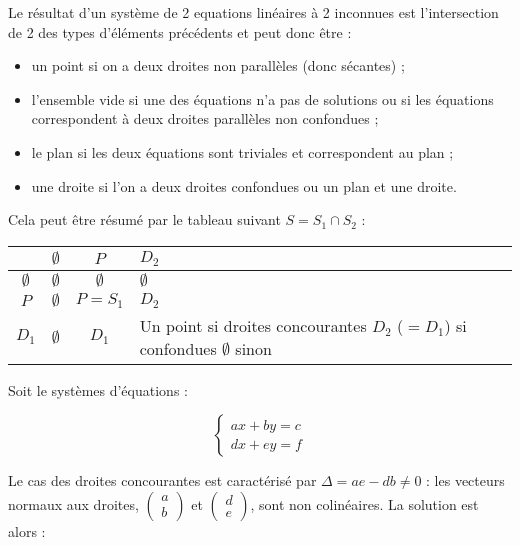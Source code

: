 \documentclass[a4paper,10pt]{report}
\begin{document}
Le résultat d'un système de 2 equations linéaires à 2 inconnues est l'intersection
de 2 des types d'éléments précédents et peut donc être :
\begin{itemize}
	\item un point si on a deux droites non parallèles (donc sécantes) ;
	\item l'ensemble vide si une des équations n'a pas de solutions ou si les équations
	      correspondent à deux droites parallèles non confondues ;
	\item le plan si les deux équations sont triviales et correspondent au plan ;
	\item une droite si l'on a deux droites confondues ou un plan et une droite.
\end{itemize}

Cela peut être résumé par le tableau suivant $S = S_1 \cap S_2$ :

\begin{tabular}{|c|c|c|p{5cm}|}
	\hline
	 \diagbox{$S_1$}{$S_2$}& $\emptyset$ & $P$         & $D_2$                            \tabularnewline
	\hline
	$\emptyset$            & $\emptyset$ & $\emptyset$ & $\emptyset$                      \tabularnewline
	\hline
	$P$                    & $\emptyset$ & $P = S_1$         & $D_2$                            \tabularnewline
	\hline
	$D_1$                  & $\emptyset$ & $D_1$       & Un point si droites concourantes \newline
	                                                     $D_2$ ($=D_1$) si confondues     \newline
	                                                     $\emptyset$ sinon                \tabularnewline
	\hline
\end{tabular}

Soit le systèmes d'équations :

\begin{displaymath}
\begin{cases}
	ax + by = c \\
	dx + ey = f
\end{cases}
\end{displaymath}

Le cas des droites concourantes est caractérisé par $\Delta = ae - db \neq 0$ : les vecteurs normaux aux droites, 
$\begin{pmatrix} a \\ b \end{pmatrix}$ et $\begin{pmatrix} d \\ e \end{pmatrix}$, sont non colinéaires.
La solution est alors :
\end{document}
